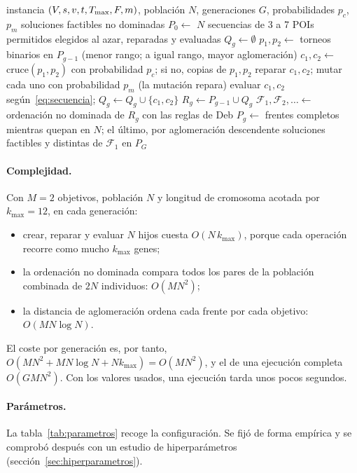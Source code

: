 \begin{algorithm}[H]
\caption{NSGA-II para el problema de orientación biobjetivo}
\label{alg:nsga2}
\small
\begin{algorithmic}[1]
\Require instancia $(V, s, v, t, T_{\max}, F, m)$, población $N$, generaciones $G$, probabilidades $p_c$, $p_m$
\Ensure soluciones factibles no dominadas
\State $P_0 \gets$ $N$ secuencias de 3 a 7 POIs permitidos elegidos al azar, reparadas y evaluadas
  \State $Q_g \gets \emptyset$
    \State $p_1, p_2 \gets$ torneos binarios en $P_{g-1}$ (menor rango; a igual rango, mayor aglomeración)
    \State $c_1, c_2 \gets$ cruce$(p_1, p_2)$ con probabilidad $p_c$; si no, copias de $p_1, p_2$
    \State reparar $c_1, c_2$; mutar cada uno con probabilidad $p_m$ (la mutación repara)
    \State evaluar $c_1, c_2$ según~\eqref{eq:secuencia}; $Q_g \gets Q_g \cup \{c_1, c_2\}$
  \EndWhile
  \State $R_g \gets P_{g-1} \cup Q_g$ 
  \State $\mathcal{F}_1, \mathcal{F}_2, \dots \gets$ ordenación no dominada de $R_g$ con las reglas de Deb
  \State $P_g \gets$ frentes completos mientras quepan en $N$; el último, por aglomeración descendente
\EndFor
\State \Return soluciones factibles y distintas de $\mathcal{F}_1$ en $P_G$
\end{algorithmic}
\end{algorithm}

\paragraph{Complejidad.} Con $M = 2$ objetivos, población $N$ y longitud de cromosoma acotada por $k_{\max} = 12$, en cada generación:
\begin{itemize}
  \item crear, reparar y evaluar $N$ hijos cuesta $O(N\,k_{\max})$, porque cada operación recorre como mucho $k_{\max}$ genes;
  \item la ordenación no dominada compara todos los pares de la población combinada de $2N$ individuos: $O(M N^2)$;
  \item la distancia de aglomeración ordena cada frente por cada objetivo: $O(M N \log N)$.
\end{itemize}
El coste por generación es, por tanto, $O(MN^2 + MN\log N + N k_{\max}) = O(MN^2)$, y el de una ejecución completa $O(G M N^2)$. Con los valores usados, una ejecución tarda unos pocos segundos.

\paragraph{Parámetros.} La tabla~\ref{tab:parametros} recoge la configuración. Se fijó de forma empírica y se comprobó después con un estudio de hiperparámetros (sección~\ref{sec:hiperparametros}).

